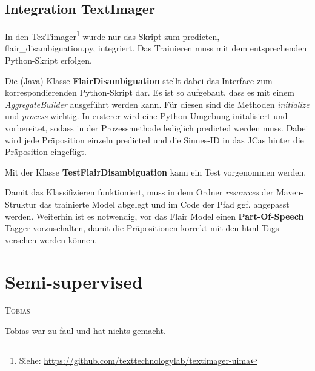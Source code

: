 \documentclass[10pt,a4paper]{article}
\newcommand{\chapterauthor}[1]{%
	{\parindent0pt\vspace*{-5pt}\hspace*{\fill}%
  \linespread{1.1}\large\scshape#1%
  \par\nobreak\vspace*{10pt}}
}
\begin{document}
\subsection{Integration TextImager}
\begin{flushleft}
In den TexTimager\footnote{Siehe: \url{https://github.com/texttechnologylab/textimager-uima}} wurde nur das Skript zum predicten, flair\_disambiguation.py, integriert. Das Trainieren muss mit dem entsprechenden Python-Skript erfolgen.

Die (Java) Klasse \textbf{FlairDisambiguation} stellt dabei das Interface zum korrespondierenden Python-Skript dar. Es ist so aufgebaut, dass es mit einem \textit{AggregateBuilder} ausgeführt werden kann. Für diesen sind die Methoden \textit{initialize} und \textit{process} wichtig. In ersterer wird eine Python-Umgebung initalisiert und vorbereitet, sodass in der Prozessmethode lediglich predicted werden muss. Dabei wird jede Präposition einzeln predicted und die Sinnes-ID in das JCas hinter die Präposition eingefügt.

Mit der Klasse \textbf{TestFlairDisambiguation} kann ein Test vorgenommen werden.

Damit das Klassifizieren funktioniert, muss in dem Ordner \textit{resources} der Maven-Struktur das trainierte Model abgelegt und im Code der Pfad ggf. angepasst werden. Weiterhin ist es notwendig, vor das Flair Model einen \textbf{Part-Of-Speech} Tagger vorzuschalten, damit die Präpositionen korrekt mit den html-Tags versehen werden können.
\end{flushleft}

\newpage

\section{Semi-supervised}
\chapterauthor{Tobias}
Tobias war zu faul und hat nichts gemacht.

\newpage

\begingroup
\raggedright
\sloppy
\printbibliography
\endgroup
\end{document}
